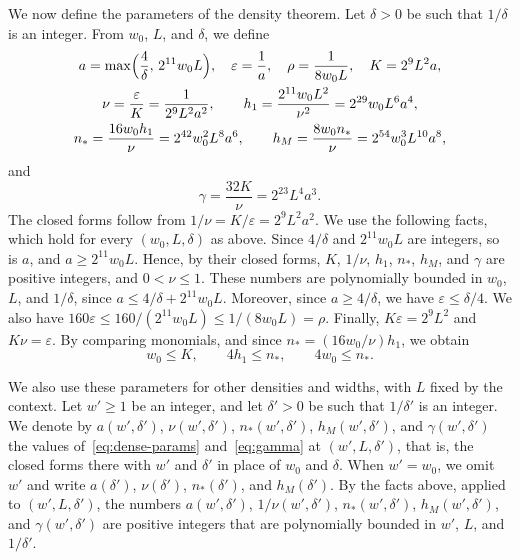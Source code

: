 \documentclass[fontsize=12pt,leading=14pt]{fullpaper}
\newcommand{\eps}{\varepsilon}
\begin{document}
We now define the parameters of the density theorem.
Let $\delta>0$ be such that $1/\delta$ is an integer.
From $w_0$, $L$, and $\delta$, we define
\begin{equation}\label{eq:dense-params}
  \begin{gathered}
    a=\max\Bigl(\frac4\delta,\,2^{11}w_0L\Bigr),\quad\eps=\frac1a,\quad\rho=\frac1{8w_0L},\quad K=2^9L^2a,\\
    \nu=\frac\eps K=\frac1{2^9L^2a^2},\qquad h_1=\frac{2^{11}w_0L^2}{\nu^2}=2^{29}w_0L^6a^4,\\
    n_*=\frac{16w_0h_1}\nu=2^{42}w_0^2L^8a^6,\qquad h_M=\frac{8w_0n_*}\nu=2^{54}w_0^3L^{10}a^8,
  \end{gathered}
\end{equation}
and
\begin{equation}\label{eq:gamma}
  \gamma=\frac{32K}\nu=2^{23}L^4a^3.
\end{equation}
The closed forms follow from $1/\nu=K/\eps=2^9L^2a^2$.
We use the following facts, which hold for every $(w_0,L,\delta)$ as above.
Since $4/\delta$ and $2^{11}w_0L$ are integers, so is $a$, and $a\ge2^{11}w_0L$.
Hence, by their closed forms, $K$, $1/\nu$, $h_1$, $n_*$, $h_M$, and $\gamma$ are positive integers, and $0<\nu\le1$.
These numbers are polynomially bounded in $w_0$, $L$, and $1/\delta$, since $a\le4/\delta+2^{11}w_0L$.
Moreover, since $a\ge4/\delta$, we have $\eps\le\delta/4$.
We also have $160\eps\le160/(2^{11}w_0L)\le1/(8w_0L)=\rho$.
Finally, $K\eps=2^9L^2$ and $K\nu=\eps$.
By comparing monomials, and since $n_*=(16w_0/\nu)h_1$, we obtain
\begin{equation}\label{eq:nstar}
  w_0\le K,\qquad4h_1\le n_*,\qquad4w_0\le n_*.
\end{equation}

We also use these parameters for other densities and widths, with $L$ fixed by the context.
Let $w'\ge1$ be an integer, and let $\delta'>0$ be such that $1/\delta'$ is an integer.
We denote by $a(w',\delta')$, $\nu(w',\delta')$, $n_*(w',\delta')$, $h_M(w',\delta')$, and $\gamma(w',\delta')$ the values of~\eqref{eq:dense-params} and~\eqref{eq:gamma} at $(w',L,\delta')$, that is, the closed forms there with $w'$ and $\delta'$ in place of $w_0$ and $\delta$.
When $w'=w_0$, we omit $w'$ and write $a(\delta')$, $\nu(\delta')$, $n_*(\delta')$, and $h_M(\delta')$.
By the facts above, applied to $(w',L,\delta')$, the numbers $a(w',\delta')$, $1/\nu(w',\delta')$, $n_*(w',\delta')$, $h_M(w',\delta')$, and $\gamma(w',\delta')$ are positive integers that are polynomially bounded in $w'$, $L$, and $1/\delta'$.
\end{document}
